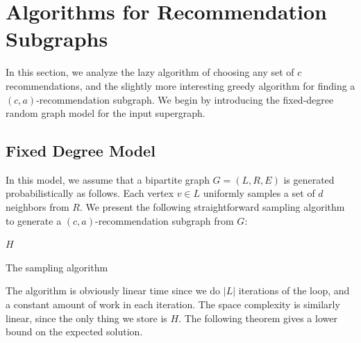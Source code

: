 \section{Algorithms for Recommendation Subgraphs}
In this section, we analyze the lazy algorithm of choosing any set of
$c$ recommendations, and the slightly more interesting greedy algorithm
for finding a $(c,a)$-recommendation subgraph. We begin by introducing
the fixed-degree random graph model for the input supergraph.


\subsection{Fixed Degree Model}
\label{fixed-degree}

In this model, we assume that a bipartite graph $G=(L,R,E)$ is
generated probabilistically as follows. Each vertex $v\in L$
uniformly samples a set of $d$ neighbors from $R$. We present the
following straightforward sampling algorithm to generate a 
$(c,a)$-recommendation subgraph from $G$:

\begin{algorithm}[H]
  \SetAlgoLined
  \Return $H$\;
  \caption{The sampling algorithm}
\end{algorithm}\vs

The algorithm is obviously linear time since we do $|L|$ iterations
of the loop, and a constant amount of work in each iteration. The space
complexity is similarly linear, since the only thing we store is $H$.
The following theorem gives a lower bound on the expected solution.



